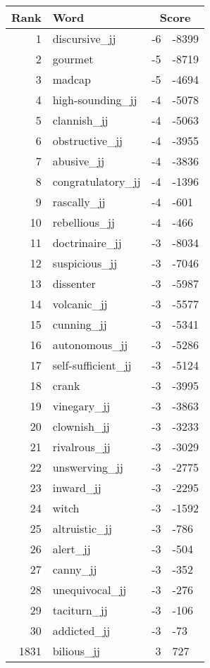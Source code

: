 \begin{longtable}[!htbp]{| rlr@{.}l |}
    \hline
    \textbf{Rank} & \textbf{Word} & \multicolumn{2}{c|}{\textbf{Score}} \\
    \hline
    \endhead
    1 & discursive\_jj & -6 & -8399 \\
    2 & gourmet & -5 & -8719 \\
    3 & madcap & -5 & -4694 \\
    4 & high-sounding\_jj & -4 & -5078 \\
    5 & clannish\_jj & -4 & -5063 \\
    6 & obstructive\_jj & -4 & -3955 \\
    7 & abusive\_jj & -4 & -3836 \\
    8 & congratulatory\_jj & -4 & -1396 \\
    9 & rascally\_jj & -4 & -601 \\
    10 & rebellious\_jj & -4 & -466 \\
    11 & doctrinaire\_jj & -3 & -8034 \\
    12 & suspicious\_jj & -3 & -7046 \\
    13 & dissenter & -3 & -5987 \\
    14 & volcanic\_jj & -3 & -5577 \\
    15 & cunning\_jj & -3 & -5341 \\
    16 & autonomous\_jj & -3 & -5286 \\
    17 & self-sufficient\_jj & -3 & -5124 \\
    18 & crank & -3 & -3995 \\
    19 & vinegary\_jj & -3 & -3863 \\
    20 & clownish\_jj & -3 & -3233 \\
    21 & rivalrous\_jj & -3 & -3029 \\
    22 & unswerving\_jj & -3 & -2775 \\
    23 & inward\_jj & -3 & -2295 \\
    24 & witch & -3 & -1592 \\
    25 & altruistic\_jj & -3 & -786 \\
    26 & alert\_jj & -3 & -504 \\
    27 & canny\_jj & -3 & -352 \\
    28 & unequivocal\_jj & -3 & -276 \\
    29 & taciturn\_jj & -3 & -106 \\
    30 & addicted\_jj & -3 & -73 \\
    1831 & bilious\_jj & 3 & 727 \\

\end{longtable}
